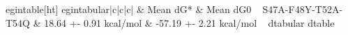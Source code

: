 egin{table}[ht]
egin{tabular}{|c|c|c|}
\hline
  & Mean dG* & Mean dG0 \
\hline
S47A-F48Y-T52A-T54Q & 18.64 +- 0.91 kcal/mol & -57.19 +- 2.21 kcal/mol \
\hline
d{tabular}
d{table}
